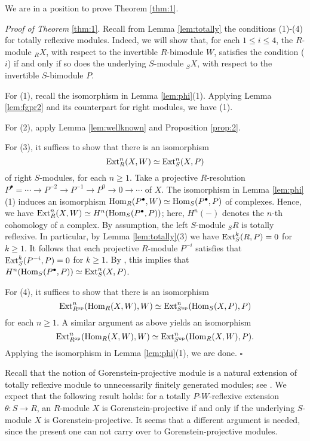 \documentclass[a4paper]{amsart}
\theoremstyle{definition}
\theoremstyle{remark}
\numberwithin{equation}{section}
\begin{document}
We are in a position to prove Theorem \ref{thm:1}.

\vskip 5pt

\noindent \emph{Proof of Theorem} \ref{thm:1}. Recall from Lemma \ref{lem:totally} the  conditions (1)-(4)
for totally reflexive modules. Indeed, we will show that, for each  $1\leq i\leq 4$,  the $R$-module $_RX$, with respect to the invertible $R$-bimodule $W$, satisfies the condition ($i$) if and only if so does the underlying $S$-module $_SX$, with respect to the invertible $S$-bimodule $P$.

For  (1), recall the isomorphism in Lemma \ref{lem:phi}(1). Applying Lemma \ref{lem:fgpr2} and its counterpart for right modules, we have (1).

For  (2), apply Lemma \ref{lem:wellknown} and Proposition \ref{prop:2}.

For  (3), it suffices to show that there is an isomorphism
$${\rm Ext}^n_R(X, W)\simeq {\rm Ext}^n_S(X, P)$$
of right $S$-modules, for each $n\geq 1$.  Take a projective $R$-resolution $P^\bullet=\cdots \rightarrow P^{-2}\rightarrow P^{-1}\rightarrow P^0\rightarrow 0 \rightarrow \cdots$ of $X$. The isomorphism in Lemma \ref{lem:phi}(1) induces an isomorphism ${\rm Hom}_R(P^\bullet, W)\simeq {\rm Hom}_S(P^\bullet, P)$ of complexes. Hence, we have ${\rm Ext}^n_R(X, W)\simeq H^n({\rm Hom}_S(P^\bullet, P))$; here, $H^n(-)$ denotes the $n$-th cohomology of a complex. By assumption, the left $S$-module $_SR$ is totally reflexive. In particular, by Lemma \ref{lem:totally}(3) we have ${\rm Ext}_S^k(R, P)=0$ for $k\geq 1$. It follows that each projective $R$-module $P^{-i}$ satisfies that ${\rm Ext}_S^k(P^{-i}, P)=0$ for $k\geq 1$. By \cite[2.4.3]{Weib}, this implies that $H^n({\rm Hom}_S(P^\bullet, P))\simeq {\rm Ext}_S^n(X, P)$.

For (4),  it suffices to show that there is an isomorphism
$${\rm Ext}^n_{R^{\rm op}}({\rm Hom}_R(X, W), W)\simeq  {\rm Ext}^n_{S^{\rm op}}({\rm Hom}_S(X, P), P)$$
for each $n\geq 1$. A similar argument as above yields an isomorphism $${\rm Ext}^n_{R^{\rm op}}({\rm Hom}_R(X, W), W)\simeq {\rm Ext}^n_{S^{\rm op}}({\rm Hom}_R(X, W), P).$$
Applying the isomorphism in Lemma \ref{lem:phi}(1), we are done. \hfill $\square$

\vskip 5pt

Recall that the notion of Gorenstein-projective module is a natural extension of
totally reflexive module to unnecessarily finitely generated modules; see \cite{EJ1}. We expect that
the following result holds:  for a totally $P$-$W$-reflexive extension $\theta\colon S\rightarrow R$,
an $R$-module $X$ is Gorenstein-projective if and only if the underlying $S$-module $X$ is Gorenstein-projective.
It seems that a different argument is needed, since the present one can not carry over to Gorenstein-projective modules.
\end{document}
